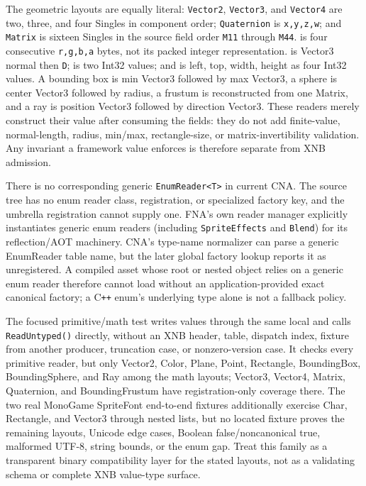 The geometric layouts are equally literal: \texttt{Vector2}, \texttt{Vector3}, and
\texttt{Vector4} are two, three, and four Singles in component order; \texttt{Quaternion} is
\texttt{x,y,z,w}; and \texttt{Matrix} is sixteen Singles in the source field order
\texttt{M11} through \texttt{M44}.  is four consecutive \texttt{r,g,b,a} bytes,
not its packed integer representation.  is Vector3 normal then \texttt{D};
 is two Int32 values; and  is left, top, width, height as
four Int32 values. A bounding box is min Vector3 followed by max Vector3, a sphere is center
Vector3 followed by radius, a frustum is reconstructed from one Matrix, and a ray is position
Vector3 followed by direction Vector3. These readers merely construct their value after consuming
the fields: they do not add finite-value, normal-length, radius, min/max, rectangle-size, or
matrix-invertibility validation. Any invariant a framework value enforces is therefore separate
from XNB admission.

There is no corresponding generic \texttt{EnumReader<T>} in current CNA. The source tree has no
enum reader class, registration, or specialized factory key, and the umbrella registration cannot
supply one. FNA's own reader manager explicitly instantiates generic enum readers (including
\texttt{SpriteEffects} and \texttt{Blend}) for its reflection/AOT machinery. CNA's type-name
normalizer can parse a generic EnumReader table name, but the later global factory lookup reports
it as unregistered. A compiled asset whose root or nested object relies on a generic enum reader
therefore cannot load without an application-provided exact canonical factory; a C\texttt{++}
enum's underlying type alone is not a fallback policy.

The focused primitive/math test writes values through the same local  and
calls \texttt{ReadUntyped()} directly, without an XNB header, table, dispatch index, fixture from
another producer, truncation case, or nonzero-version case. It checks every primitive reader, but
only Vector2, Color, Plane, Point, Rectangle, BoundingBox, BoundingSphere, and Ray among the
math layouts; Vector3, Vector4, Matrix, Quaternion, and BoundingFrustum have registration-only
coverage there. The two real MonoGame SpriteFont end-to-end fixtures additionally exercise
Char, Rectangle, and Vector3 through nested lists, but no located fixture proves the remaining
layouts, Unicode edge cases, Boolean false/noncanonical true, malformed UTF-8, string bounds, or
the enum gap. Treat this family as a transparent binary compatibility layer for the stated
layouts, not as a validating schema or complete XNB value-type surface.

